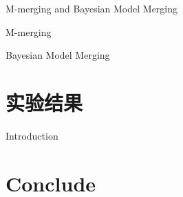 \documentclass{beamer}
\begin{document}
\begin{frame}{M-merging and Bayesian Model Merging}
\begin{block}{M-merging}
    
\end{block}

\begin{block}{Bayesian Model Merging}
    
\end{block}
\end{frame}



\section{实验结果}
\begin{frame}{Introduction}

\end{frame}

\section{Conclude}
\end{document}
